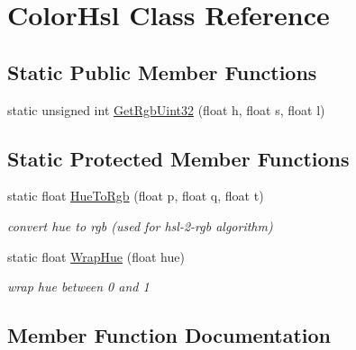 \hypertarget{classColorHsl}{}\section{Color\+Hsl Class Reference}
\label{classColorHsl}
\subsection*{Static Public Member Functions}
\begin{DoxyCompactItemize}
\item 
static unsigned int \hyperlink{classColorHsl_ae9451e6216d6e40eb1d0754e580f4b01}{Get\+Rgb\+Uint32} (float h, float s, float l)
\end{DoxyCompactItemize}
\subsection*{Static Protected Member Functions}
\begin{DoxyCompactItemize}
\item 
\mbox{\label{classColorHsl_ae5ee64095d7aaebb01498de2180daa9f}} 
static float \hyperlink{classColorHsl_ae5ee64095d7aaebb01498de2180daa9f}{Hue\+To\+Rgb} (float p, float q, float t)
\begin{DoxyCompactList}\small\item\em convert hue to rgb (used for hsl-\/2-\/rgb algorithm) \end{DoxyCompactList}\item 
\mbox{\label{classColorHsl_a891b3f489be291ab418bffd0cc48f0ee}} 
static float \hyperlink{classColorHsl_a891b3f489be291ab418bffd0cc48f0ee}{Wrap\+Hue} (float hue)
\begin{DoxyCompactList}\small\item\em wrap hue between 0 and 1 \end{DoxyCompactList}\end{DoxyCompactItemize}


\subsection{Member Function Documentation}
\mbox{\label{classColorHsl_ae9451e6216d6e40eb1d0754e580f4b01}} 

